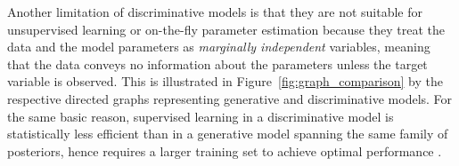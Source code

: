 \documentclass[english]{scrartcl}
\begin{document}



Another limitation of discriminative models is that they are not suitable for unsupervised learning or on-the-fly parameter estimation because they treat the data and the model parameters as {\em marginally independent} variables, meaning that the data conveys no information about the parameters unless the target variable is observed. This is illustrated in Figure~\ref{fig:graph_comparison} by the respective directed graphs representing generative and discriminative models. For the same basic reason, supervised learning in a discriminative model is statistically less efficient than in a generative model spanning the same family of posteriors, hence requires a larger training set to achieve optimal performance \cite{Ng-01}. 

\end{document}
